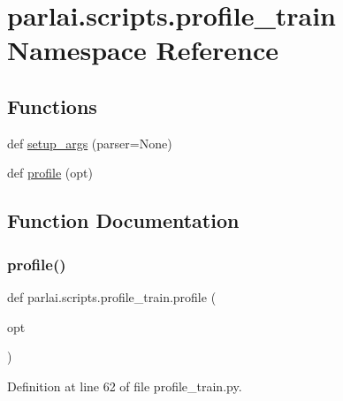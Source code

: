\hypertarget{namespaceparlai_1_1scripts_1_1profile__train}{}\section{parlai.\+scripts.\+profile\+\_\+train Namespace Reference}
\label{namespaceparlai_1_1scripts_1_1profile__train}
\subsection*{Functions}
\begin{DoxyCompactItemize}
\item 
def \hyperlink{namespaceparlai_1_1scripts_1_1profile__train_abc73daf8a16d21ce56906342ec15cda9}{setup\+\_\+args} (parser=None)
\item 
def \hyperlink{namespaceparlai_1_1scripts_1_1profile__train_a72ecdcc9932f8566d611093a2daeaa2a}{profile} (opt)
\end{DoxyCompactItemize}


\subsection{Function Documentation}
\mbox{\label{namespaceparlai_1_1scripts_1_1profile__train_a72ecdcc9932f8566d611093a2daeaa2a}} 
\subsubsection{\texorpdfstring{profile()}{profile()}}
{\footnotesize\ttfamily def parlai.\+scripts.\+profile\+\_\+train.\+profile (\begin{DoxyParamCaption}\item[{}]{opt }\end{DoxyParamCaption})}



Definition at line 62 of file profile\+\_\+train.\+py.


